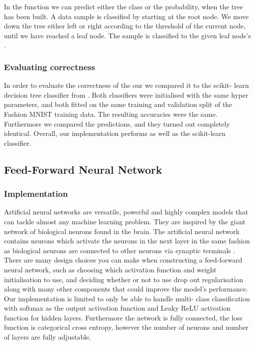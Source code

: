 \documentclass[../main.tex]{subfiles}
\begin{document}
In the function  we can predict either 
the class or the probability, when the tree has been built. A 
data sample is classified by starting at the root node. We move 
down the tree either left or right according to the threshold of 
the current node, until we have reached a leaf node. The sample 
is classified to the given leaf node's 
. 


\subsubsection{Evaluating correctness}

In order to evaluate the correctness of the our 
 we compared it to the scikit-
learn decision tree classifier from . 
Both classifiers were initialised with the same hyper parameters, 
and both fitted on the same training and validation split of the 
Fashion MNIST training data. 
The resulting accuracies were the same. 
Furthermore we compared the predictions, and they turned 
out completely identical. Overall, our implementation performs as 
well as the scikit-learn classifier. 


\subsection{Feed-Forward Neural Network}

\subsubsection{Implementation}

Artificial neural networks are versatile, powerful and highly 
complex models that can tackle almost any machine learning 
problem. They are inspired by the giant network of biological 
neurons found in the brain. The artificial neural network 
contains neurons which activate the neurons in the next layer in 
the same fashion as biological neurons are connected to other 
neurons via synaptic terminals \autocite{geronHandsOn}. 
There are many design choices you can make when constructing a 
feed-forward neural network, such as choosing which activation 
function and weight initialisation to use, and deciding whether 
or not to use drop out regularisation along with many other 
components that could improve the model's performance. 
Our implementation is limited to only be able to handle multi-
class classification with softmax as the output activation 
function and Leaky ReLU activation function for hidden layers. 
Furthermore the network is fully connected, the loss function is 
categorical cross entropy, however the number of neurons and 
number of layers are fully adjustable. 
\end{document}
